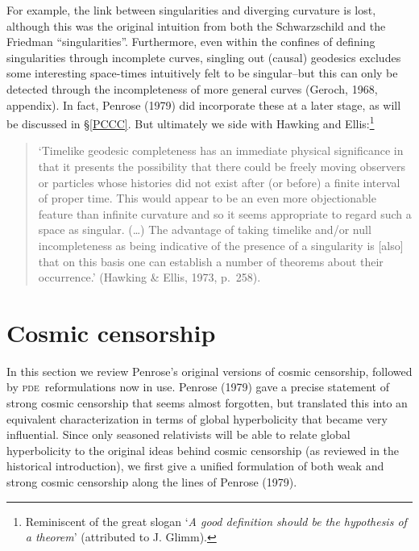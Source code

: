 \documentclass[12pt]{article}
\newcommand{\pde}{\textsc{pde}}
\begin{document}
For example, the link between singularities and diverging curvature is lost, although this was the original intuition  from both the Schwarzschild and the Friedman ``singularities''. Furthermore, even within the confines of defining singularities through incomplete curves, singling out (causal) geodesics excludes some interesting space-times intuitively felt to be singular--but this can only be detected through the incompleteness of more general curves (Geroch, 1968, appendix). In fact, Penrose (1979)  did incorporate these at a later stage, as will be discussed in \S\ref{PCCC}. 
But ultimately we side with 
  Hawking and Ellis:\footnote{Reminiscent of the great slogan `\emph{A good definition should be the hypothesis of a theorem}' (attributed to J. Glimm).}
 \begin{quote}\begin{small}
`Timelike geodesic completeness has an immediate physical significance in that it presents the possibility that there could be freely moving observers or particles whose histories did not exist after (or before) a finite interval of proper time. This would appear to be an even more objectionable feature than infinite curvature and so it seems appropriate to regard such a space as singular. (\ldots)  The advantage of taking timelike and/or null incompleteness as being indicative of the presence of a singularity is [also] that on this basis one can establish a number of theorems about their occurrence.' (Hawking \& Ellis, 1973, p.\ 258).
 \end{small}
\end{quote}
\section{Cosmic censorship}\label{CCC}
In this section we review Penrose's original versions of cosmic censorship, followed by \pde\ reformulations now in  use.
Penrose (1979) gave a precise statement of strong cosmic censorship that seems almost forgotten, but  translated this into an equivalent characterization in terms of global hyperbolicity that became very influential. 
Since only seasoned relativists will be able to relate global hyperbolicity to the original ideas behind cosmic censorship  (as reviewed in the historical introduction), we first 
 give a unified formulation of both weak and strong cosmic censorship along the lines of Penrose (1979). 
\end{document}
